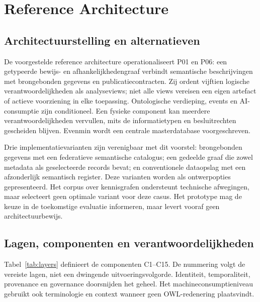 \section{Reference Architecture}
\label{sec:architecture}
\subsection{Architectuurstelling en alternatieven}
De voorgestelde reference architecture operationaliseert P01 en P06: een getypeerde bewijs- en afhankelijkhedengraaf verbindt semantische beschrijvingen met brongebonden gegevens en publicatiecontracten. Zij ordent vijftien logische verantwoordelijkheden als analyseviews; niet alle views vereisen een eigen artefact of actieve voorziening in elke toepassing. Ontologische verdieping, events en AI-consumptie zijn conditioneel. Een fysieke component kan meerdere verantwoordelijkheden vervullen, mits de informatietypen en besluitrechten gescheiden blijven. Evenmin wordt een centrale masterdatabase voorgeschreven.

Drie implementatievarianten zijn verenigbaar met dit voorstel: brongebonden gegevens met een federatieve semantische catalogus; een gedeelde graaf die zowel metadata als geselecteerde records bevat; en conventionele dataopslag met een afzonderlijk semantisch register. Deze varianten worden als ontwerpopties gepresenteerd. Het corpus over kennisgrafen ondersteunt technische afwegingen, maar selecteert geen optimale variant voor deze casus. \citep{L13} Het prototype mag de keuze in de toekomstige evaluatie informeren, maar levert vooraf geen architectuurbewijs.

\subsection{Lagen, componenten en verantwoordelijkheden}
Tabel~\ref{tab:layers} definieert de componenten C1--C15. De nummering volgt de vereiste lagen, niet een dwingende uitvoeringsvolgorde. Identiteit, temporaliteit, provenance en governance doorsnijden het geheel. Het machineconsumptieniveau gebruikt ook terminologie en context wanneer geen OWL-redenering plaatsvindt.

